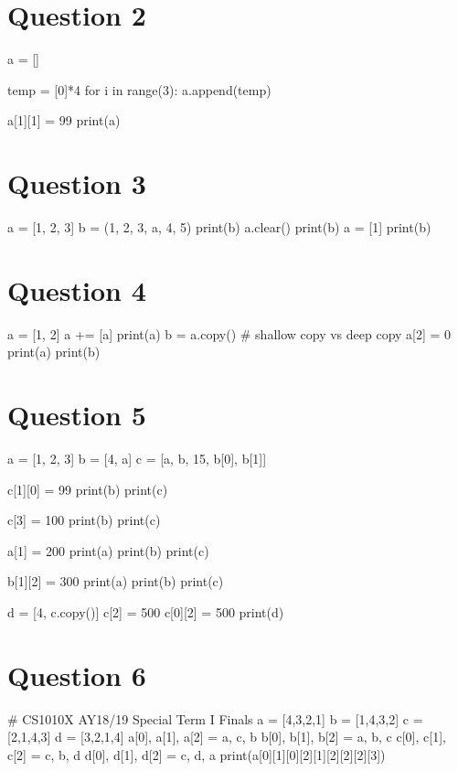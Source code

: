 \section{Question 2}
\begin{python}
a = []

temp = [0]*4
for i in range(3):
    a.append(temp)

a[1][1] = 99
print(a)
\end{python}

\section{Question 3}
\begin{python}
a = [1, 2, 3]
b = (1, 2, 3, a, 4, 5)
print(b)
a.clear()
print(b)
a = [1]
print(b)
\end{python}

\section{Question 4}
\begin{python}
a = [1, 2]
a += [a]
print(a)
b = a.copy() # shallow copy vs deep copy
a[2] = 0
print(a)
print(b)
\end{python}

\section{Question 5}
\begin{python}
a = [1, 2, 3]
b = [4, a]
c = [a, b, 15, b[0], b[1]]

c[1][0] = 99
print(b)
print(c)

c[3] = 100
print(b)
print(c)

a[1] = 200
print(a)
print(b)
print(c)

b[1][2] = 300
print(a)
print(b)
print(c)

d = [4, c.copy()]
c[2] = 500
c[0][2] = 500
print(d)
\end{python}

\section{Question 6}
\begin{python}
# CS1010X AY18/19 Special Term I Finals
a = [4,3,2,1]
b = [1,4,3,2]
c = [2,1,4,3]
d = [3,2,1,4]
a[0], a[1], a[2] = a, c, b
b[0], b[1], b[2] = a, b, c
c[0], c[1], c[2] = c, b, d
d[0], d[1], d[2] = c, d, a
print(a[0][1][0][2][1][2][2][2][3])
\end{python}

